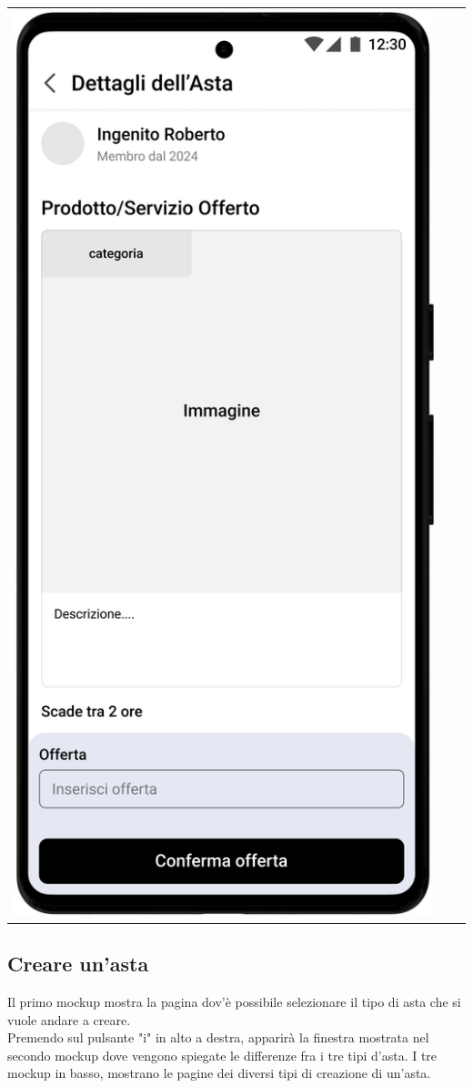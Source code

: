 \begin{center}
\begin{tabular}{ccc}
		\includegraphics[width=.3\textwidth]{assets/mockup/Dettaglio Asta Silenziosa.png}    \\
	\end{tabular}
\end{center}

\newpage
\subsection{Creare un'asta}
Il primo mockup mostra la pagina dov'è possibile selezionare il tipo di asta che si vuole andare a creare.\\
Premendo sul pulsante "i" in alto a destra, apparirà la finestra mostrata nel secondo mockup dove vengono spiegate le differenze fra i tre tipi d'asta.\meskip
I tre mockup in basso, mostrano le pagine dei diversi tipi di creazione di un'asta.

